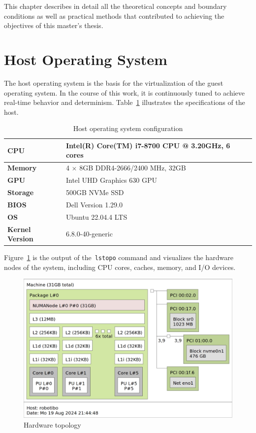 \documentclass[MMR,Master,english]{twbook}
\begin{document}
This chapter describes in detail all the theoretical concepts and boundary conditions as well as practical methods that contributed to achieving the objectives of this master's thesis.

\section{Host Operating System}\label{sec:host_operating_system}
The host operating system is the basis for the virtualization of the guest operating system. In the course of this work, it is continuously tuned to achieve real-time behavior and determinism. Table~\ref{tab:testbed_configuration} illustrates the specifications of the host.

\begin{table}[H]
	\centering
	\caption[Host operating system configuration]{Host operating system configuration}
	\label{tab:testbed_configuration}
	\setlength{\tabcolsep}{0.5em} %
	{\renewcommand{\arraystretch}{1.2}%
		\begin{tabular}{|l|l|}
			\hline
			\textbf{CPU}            & Intel(R) Core(TM) i7-8700 CPU @ 3.20GHz, 6 cores \\ \hline
			\textbf{Memory}         & 4 $\times$ 8GB DDR4-2666/2400 MHz, 32GB          \\ \hline
			\textbf{GPU}            & Intel UHD Graphics 630 GPU                       \\ \hline
			\textbf{Storage}        & 500GB NVMe SSD                                   \\ \hline
			\textbf{BIOS}           & Dell Version 1.29.0                              \\ \hline
			\textbf{OS}             & Ubuntu 22.04.4 LTS                               \\ \hline
			\textbf{Kernel Version} & 6.8.0-40-generic                                 \\ \hline
		\end{tabular}}
\end{table}

\noindent Figure~\ref{fig:lstopo} is the output of the~\texttt{lstopo} command and visualizes the hardware nodes of the system, including CPU cores, caches, memory, and I/O devices.
\begin{figure}[H]
	\centering
	\includegraphics[width=0.55\columnwidth]{img/lstopo.png}
	\caption[Hardware topology]{Hardware topology}
	\label{fig:lstopo}
\end{figure}
\end{document}
